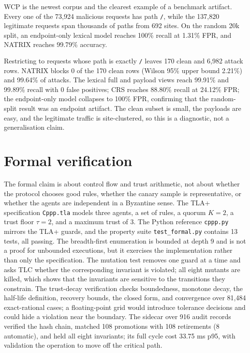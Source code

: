 \documentclass[preprint,11pt]{elsarticle}
\begin{document}
WCP is the newest corpus and the clearest example of a benchmark
artifact. Every one of the 73,924 malicious requests has path
\texttt{/\allowbreak{}}, while the 137,820 legitimate requests span thousands of
paths from 692 sites. On the random 20k split, an endpoint-only lexical
model reaches 100\% recall at 1.31\% FPR, and NATRIX reaches 99.79\%
accuracy.

Restricting to requests whose path is exactly \texttt{/\allowbreak{}} leaves 170
clean and 6,982 attack rows. NATRIX blocks 0 of the 170 clean rows
(Wilson 95\% upper bound 2.21\%) and 99.64\% of attacks. The lexical
full and payload views reach 99.91\% and 99.89\% recall with 0 false
positives; CRS reaches 88.80\% recall at 24.12\% FPR; the endpoint-only
model collapses to 100\% FPR, confirming that the random-split result
was an endpoint artifact. The clean subset is small, the payloads are
easy, and the legitimate traffic is site-clustered, so this is a
diagnostic, not a generalisation claim.

\section{Formal verification}\label{formal-verification}

The formal claim is about control flow and trust arithmetic, not about
whether the protocol chooses good rules, whether the canary sample is
representative, or whether the agents are independent in a Byzantine
sense. The TLA+ specification \citep{lamport2002specifying}
\texttt{Cppp.\allowbreak{}tla} models three agents, a set of rules, a quorum \(K=2\),
a trust floor \(\tau=2\), and a maximum trust of 3. The Python reference
\texttt{cppp.\allowbreak{}py} mirrors the TLA+ guards, and the property suite
\texttt{test\_\allowbreak{}formal.\allowbreak{}py} contains 13 tests, all passing. The
breadth-first enumeration is bounded at depth 9 and is not a proof for
unbounded executions, but it exercises the implementation rather than
only the specification. The mutation test removes one guard at a time
and asks TLC whether the corresponding invariant is violated; all eight
mutants are killed, which shows that the invariants are sensitive to the
transitions they constrain. The trust-decay verification checks
boundedness, monotone decay, the half-life definition, recovery bounds,
the closed form, and convergence over 81,484 exact-rational cases; a
floating-point grid would introduce tolerance decisions and could hide a
violation near the boundary. The sidecar over 916 audit records verified
the hash chain, matched 108 promotions with 108 retirements (8
automatic), and held all eight invariants; its full cycle cost 33.75 ms
p95, with validation the operation to move off the critical path.
\end{document}
